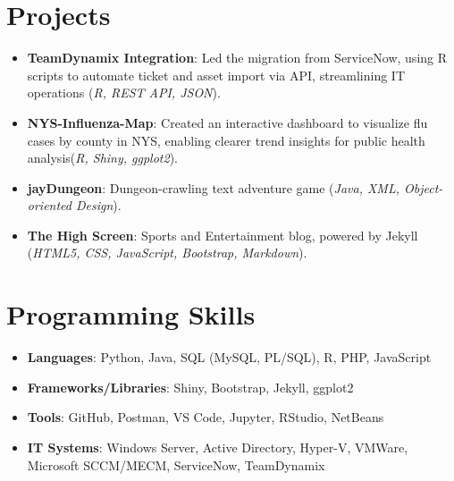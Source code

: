 \documentclass[letterpaper,11pt]{article}
\newcommand{\resumeItem}[2]{
  \item\small{
    \textbf{#1}{: #2 \vspace{-2pt}}
  }
}
\newcommand{\resumeSubItem}[2]{\resumeItem{#1}{#2}\vspace{-4pt}}
\newcommand{\resumeSubHeadingListStart}{\begin{itemize}[leftmargin=*]}
\newcommand{\resumeSubHeadingListEnd}{\end{itemize}}
\begin{document}
\section{Projects}
  	\resumeSubHeadingListStart
	  	\resumeSubItem{TeamDynamix Integration}{Led the migration from ServiceNow, using R scripts to automate ticket and asset import via API, streamlining IT operations (\textit{R, REST API, JSON}).}
   		\resumeSubItem{NYS-Influenza-Map}{Created an interactive dashboard to visualize flu cases by county in NYS, enabling clearer trend insights for public health analysis(\textit{R, Shiny, ggplot2}).}
   		\resumeSubItem{jayDungeon}{Dungeon-crawling text adventure game (\textit{Java, XML, Object-oriented Design}).}
    	\resumeSubItem{The High Screen}{Sports and Entertainment blog, powered by Jekyll (\textit{HTML5, CSS, JavaScript, Bootstrap, Markdown}).}
  	\resumeSubHeadingListEnd

\section{Programming Skills}
  	\resumeSubHeadingListStart
		\resumeSubItem{Languages}{Python, Java, SQL (MySQL, PL/SQL), R, PHP, JavaScript}
		\resumeSubItem{Frameworks/Libraries}{Shiny, Bootstrap, Jekyll, ggplot2} 
		\resumeSubItem{Tools}{GitHub, Postman, VS Code, Jupyter, RStudio, NetBeans} 
		\resumeSubItem{IT Systems}{Windows Server, Active Directory, Hyper-V, VMWare, Microsoft SCCM/MECM, ServiceNow, TeamDynamix} 
	\resumeSubHeadingListEnd

\end{document}
